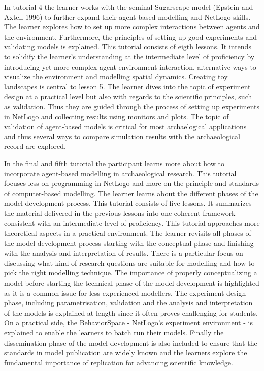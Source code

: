 \documentclass[
]{article}
\begin{document}
In tutorial 4 the learner works with the seminal Sugarscape model (Epstein and Axtell 1996) to further expand their agent-based modelling and NetLogo skills. The learner explores how to set up more complex interactions between agents and the environment. Furthermore, the principles of setting up good experiments and validating models is explained. This tutorial consists of eigth lessons. It intends to solidify the learner's understanding at the intermediate level of proficiency by introducing yet more complex agent-environment interaction, alternative ways to visualize the environment and modelling spatial dynamics. Creating toy landscapes is central to lesson 5. The learner dives into the topic of experiment design at a practical level but also with regards to the scientific principles, such as validation. Thus they are guided through the process of setting up experiments in NetLogo and collecting results using monitors and plots. The topic of validation of agent-based models is critical for most archaelogical applications and thus several ways to compare simulation results with the archaeological record are explored.

In the final and fifth tutorial the participant learns more about how to incorporate agent-based modelling in archaeological research. This tutorial focuses less on programming in NetLogo and more on the principle and standards of computer-based modelling. The learner learns about the different phases of the model development process. This tutorial consists of five lessons. It summarizes the material delivered in the previous lessons into one coherent framework consistent with an intermediate level of proficiency. This tutorial approaches more theoretical aspects in a practical environment. The learner revisits all phases of the model development process starting with the conceptual phase and finishing with the analysis and interpretation of results. There is a particular focus on discussing what kind of research questions are suitable for modelling and how to pick the right modelling technique. The importance of properly conceptualizing a model before starting the technical phase of the model development is highlighted as it is a common issue for less experienced modellers. The experiment design phase, including parametrisation, validation and the analysis and interpretation of the models is explained at length since it often proves challenging for students. On a practical side, the BehaviorSpace - NetLogo's experiment environment - is explained to enable the learners to batch run their models. Finally the dissemination phase of the model development is also included to ensure that the standards in model publication are widely known and the learners explore the fundamental importance of replication for advancing scientific knowledge.
\end{document}

